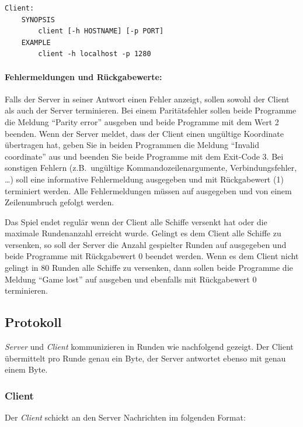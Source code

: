 \vspace{-10pt}
\begin{verbatim}
Client:
    SYNOPSIS
        client [-h HOSTNAME] [-p PORT]
    EXAMPLE
        client -h localhost -p 1280
\end{verbatim}

\paragraph{Fehlermeldungen und Rückgabewerte:}

Falls der Server in seiner Antwort einen Fehler anzeigt, sollen sowohl der Client als auch der Server terminieren.
Bei einem Paritätsfehler sollen beide Programme die Meldung ``Parity error'' ausgeben
und beide Programme mit dem Wert 2 beenden.
Wenn der Server meldet, dass der Client einen ungültige Koordinate übertragen hat,
geben Sie in beiden Programmen die Meldung ``Invalid coordinate'' aus und beenden Sie beide Programme mit dem Exit-Code 3.
Bei sonstigen Fehlern (z.B.\ ungültige Kommandozeilenargumente, Verbindungsfehler, \ldots)
soll eine informative Fehlermeldung ausgegeben und mit Rückgabewert
 (1) terminiert werden. Alle Fehlermeldungen müssen auf
 ausgegeben und von einem Zeilenumbruch gefolgt werden.

Das Spiel endet regulär wenn der Client alle Schiffe versenkt hat oder die maximale Rundenanzahl erreicht wurde.
Gelingt es dem Client alle Schiffe zu versenken, so soll der Server die Anzahl gespielter Runden auf  ausgegeben und beide
Programme mit Rückgabewert 0 beendet werden.
Wenn es dem Client nicht gelingt in 80 Runden alle Schiffe zu versenken, dann sollen beide Programme die Meldung ``Game lost'' auf  ausgeben
und ebenfalls mit Rückgabewert 0 terminieren.

\subsection*{Protokoll}
\label{sec:prot}
\emph{Server} und \emph{Client} kommunizieren in Runden wie nachfolgend
gezeigt. Der Client übermittelt pro Runde genau ein Byte,
der Server antwortet ebenso mit genau einem Byte.

\subsubsection*{Client}
Der \emph{Client} schickt an den Server Nachrichten im folgenden Format:

